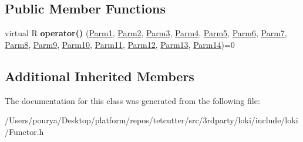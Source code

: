 \subsection*{Public Member Functions}
\begin{DoxyCompactItemize}
\item 
\hypertarget{classLoki_1_1FunctorImpl_3_01R_00_01_01_01_01_01_01_01_01_01_01_01_01_01_01_01_01_01_01_01_01_01ae97c0dda0b09cac4a281c5ef95111da_a0620781457e4cda45ed5235608adb71c}{}virtual R {\bfseries operator()} (\hyperlink{classLoki_1_1EmptyType}{Parm1}, \hyperlink{classLoki_1_1EmptyType}{Parm2}, \hyperlink{classLoki_1_1EmptyType}{Parm3}, \hyperlink{classLoki_1_1EmptyType}{Parm4}, \hyperlink{classLoki_1_1EmptyType}{Parm5}, \hyperlink{classLoki_1_1EmptyType}{Parm6}, \hyperlink{classLoki_1_1EmptyType}{Parm7}, \hyperlink{classLoki_1_1EmptyType}{Parm8}, \hyperlink{classLoki_1_1EmptyType}{Parm9}, \hyperlink{classLoki_1_1EmptyType}{Parm10}, \hyperlink{classLoki_1_1EmptyType}{Parm11}, \hyperlink{classLoki_1_1EmptyType}{Parm12}, \hyperlink{classLoki_1_1EmptyType}{Parm13}, \hyperlink{classLoki_1_1EmptyType}{Parm14})=0\label{classLoki_1_1FunctorImpl_3_01R_00_01_01_01_01_01_01_01_01_01_01_01_01_01_01_01_01_01_01_01_01_01ae97c0dda0b09cac4a281c5ef95111da_a0620781457e4cda45ed5235608adb71c}

\end{DoxyCompactItemize}
\subsection*{Additional Inherited Members}


The documentation for this class was generated from the following file\+:\begin{DoxyCompactItemize}
\item 
/\+Users/pourya/\+Desktop/platform/repos/tetcutter/src/3rdparty/loki/include/loki/Functor.\+h\end{DoxyCompactItemize}

